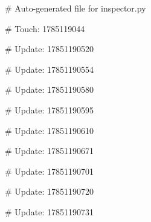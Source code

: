 # Auto-generated file for inspector.py

# Touch: 1785119044

# Update: 17851190520

# Update: 17851190554

# Update: 17851190580

# Update: 17851190595

# Update: 17851190610

# Update: 17851190671

# Update: 17851190701

# Update: 17851190720

# Update: 17851190731
